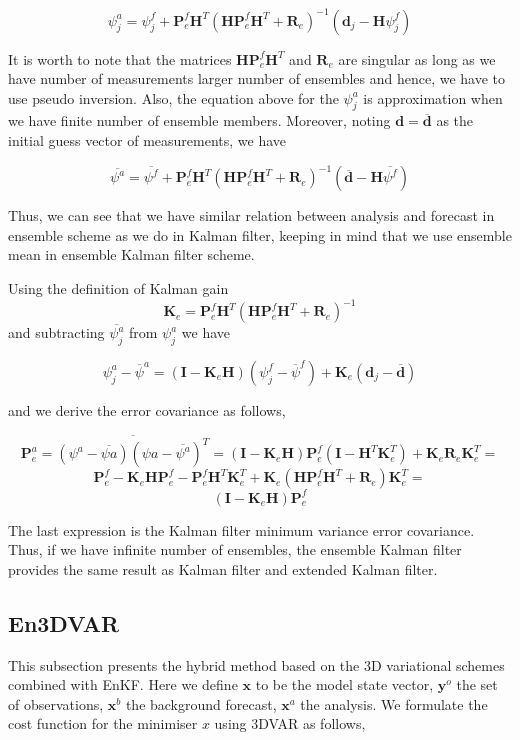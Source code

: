 \documentclass[a4,12pt]{article}
\numberwithin{equation}{section}
\begin{document}
$$\psi ^{a} _{j}= \psi ^{f}_{j} + \textbf{P} _{e} ^{f}\textbf{H} ^{T}(\textbf{HP}_{e} ^{f}\textbf{H} ^{T}+\textbf{R}_{e}) ^{-1}(\textbf{d}_{j}-\textbf{H}\psi ^{f}_{j})$$

It is worth to note that the matrices $\textbf{H}\textbf{P}^{f}_{e}\textbf{H}^{T}$ and $\textbf{R}_{e}$ are singular as long as we have number of measurements larger number of ensembles and hence, we have to use pseudo inversion. Also, the equation above for the $\psi ^{a} _{j}$ is approximation when we have finite number of ensemble members. Moreover, noting $\textbf{d} = \overline{\textbf{d}}$ as the initial guess vector of measurements, we have

$$\overline{\psi ^{a}} = \overline{\psi ^{f}} + \textbf{P} ^{f}_{e}\textbf{H} ^{T}(\textbf{HP}_{e} ^{f}\textbf{H} ^{T}+\textbf{R}_{e}) ^{-1}(\overline{\textbf{d}}-\textbf{H}\overline{\psi ^{f}})$$

Thus, we can see that we have similar relation between analysis and forecast in ensemble scheme as we do in Kalman filter, keeping in mind that we use ensemble mean in ensemble Kalman filter scheme.

Using the definition of Kalman gain $$\textbf{K}_{e} = \textbf{P}_{e}^{f}\textbf{H}^{T}(\textbf{H}\textbf{P}^{f}_{e}\textbf{H}^{T}+\textbf{R}_{e})^{-1}$$ and subtracting $\overline{\psi_{j}^{a}}$ from $\psi_{j}^{a}$ we have

$$\psi_{j}^{a}-\overline{\psi}^{a} = (\textbf{I}-\textbf{K}_{e}\textbf{H})(\psi_{j}^{f} - \overline{\psi}^{f})+\textbf{K}_{e}(\textbf{d}_{j}-\overline{\textbf{d}})$$

and we derive the error covariance as follows,

$$\textbf{P}_{e}^{a} = \overline {(\psi^{a} - \overline{\psi{a}})(\psi{a} - \overline{\psi^{a}})^{T}} = (\textbf{I}-\textbf{K}_{e}\textbf{H})\textbf{P}_{e}^{f}(\textbf{I}-\textbf{H}^{T}\textbf{K}_{e}^{T})+\textbf{K}_{e}\textbf{R}_{e}\textbf{K}_{e}^{T}=$$$$\textbf{P}_{e}^{f} - \textbf{K}_{e}\textbf{H}\textbf{P}_{e}^{f} - \textbf{P}_{e}^{f}\textbf{H}^{T}\textbf{K}_{e}^{T} + \textbf{K}_{e}(\textbf{H}\textbf{P}_{e}^{f}\textbf{H}^{T}+\textbf{R}_{e})\textbf{K}_{e}^{T} =$$$$ (\textbf{I}-\textbf{K}_{e}\textbf{H})\textbf{P}_{e}^{f}$$ 

The last expression is the Kalman filter minimum variance error covariance. Thus, if we have infinite number of ensembles, the ensemble Kalman filter provides the same result as Kalman filter and extended Kalman filter.

\subsection{En3DVAR}
This subsection presents the hybrid method based on the 3D variational schemes combined with EnKF.
Here we define $\textbf{x}$ to be the model state vector, $\textbf{y}^{o}$ the set of observations, $\textbf{x}^{b}$ the background forecast, $\textbf{x}^{a}$ the analysis. We formulate the cost function for the minimiser $x$ using 3DVAR as follows,
\end{document}
